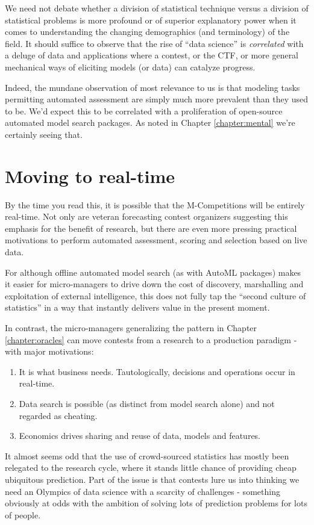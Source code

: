 We need not debate whether a division of statistical technique versus a division of statistical problems is more profound or of superior explanatory power when it comes to understanding the changing demographics (and terminology) of the field. It should suffice to observe that the rise of ``data science'' is {\em correlated} with a deluge of data and applications where a contest, or the CTF, or more general mechanical ways of eliciting models (or data) can catalyze progress. 

Indeed, the mundane observation of most relevance to us is that modeling tasks permitting automated assessment are simply much more prevalent than they used to be. We'd expect this to be correlated with a proliferation of open-source automated model search packages. As noted in Chapter \ref{chapter:mental} we're certainly seeing that.


\section{Moving to real-time}

By the time you read this, it is possible that the M-Competitions will be entirely real-time. Not only are veteran forecasting contest organizers suggesting this emphasis for the benefit of research, but there are even more pressing practical motivations to perform automated assessment, scoring and selection based on live data. 

For although offline automated model search (as with AutoML packages) makes it easier for micro-managers to drive down the cost of discovery, marshalling and exploitation of external intelligence, this does not fully tap the ``second culture of statistics'' in a way that instantly delivers value in the present moment.

In contrast, the micro-managers generalizing the pattern in Chapter \ref{chapter:oracles} can move contests from a research to a production paradigm - with major motivations:
\begin{enumerate}
    \item It is what business needs. Tautologically, decisions and operations occur in real-time. 
    \item Data search is possible (as distinct from model search alone) and not regarded as cheating.
    \item Economics drives sharing and reuse of data, models and features.
\end{enumerate}   

It almost seems odd that the use of crowd-sourced statistics has mostly been relegated to the research cycle, where it stands little chance of providing cheap ubiquitous prediction.  
Part of the issue is that contests lure us into thinking we need an Olympics of data science with a scarcity of challenges - something obviously at odds with the ambition of solving lots of prediction problems for lots of people.   

